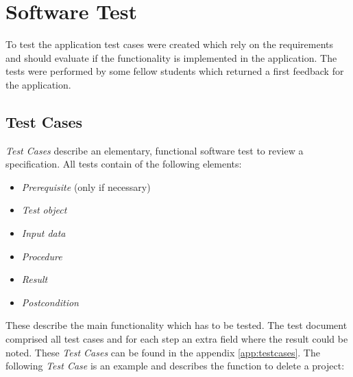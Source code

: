 \chapter{Software Test}

To test the application test cases were created which rely on the requirements and should evaluate if the functionality is implemented in the application. The tests were performed by some fellow students which returned a first feedback for the application.

\section{Test Cases}

\textit{Test Cases} describe an elementary, functional software test to review a specification. All tests contain of the following elements:
\begin{itemize}
	\item \textit{Prerequisite} (only if necessary)
	\item \textit{Test object}
	\item \textit{Input data}
	\item \textit{Procedure}
	\item \textit{Result}
	\item \textit{Postcondition}
\end{itemize}
These describe the main functionality which has to be tested. The test document comprised all test cases and for each step an extra field where the result could be noted. These \textit{Test Cases} can be found in the appendix \ref{app:testcases}. The following \textit{Test Case} is an example and describes the function to delete a project:
